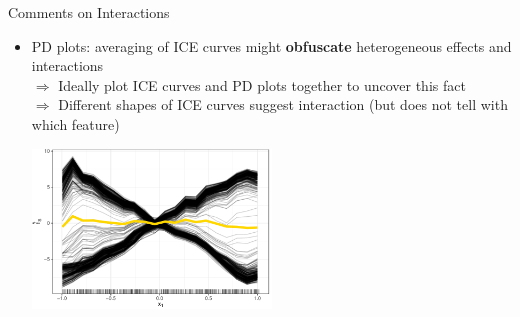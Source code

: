\documentclass[11pt,compress,t,notes=noshow, aspectratio=169, xcolor=table]{beamer}
\begin{document}
\begin{frame}{Comments on Interactions}
\begin{itemize}

\item PD plots: averaging of ICE curves might \textbf{obfuscate} heterogeneous effects and interactions \\ 
\(\Rightarrow\) Ideally plot ICE curves and PD plots together to uncover this fact\\
\(\Rightarrow\) Different shapes of ICE curves suggest interaction (but does not tell with which  feature)

\begin{center}\includegraphics[width=0.5\textwidth]{figure/pdp_xor.pdf} \end{center}
\end{itemize}

\end{frame}
\end{document}
